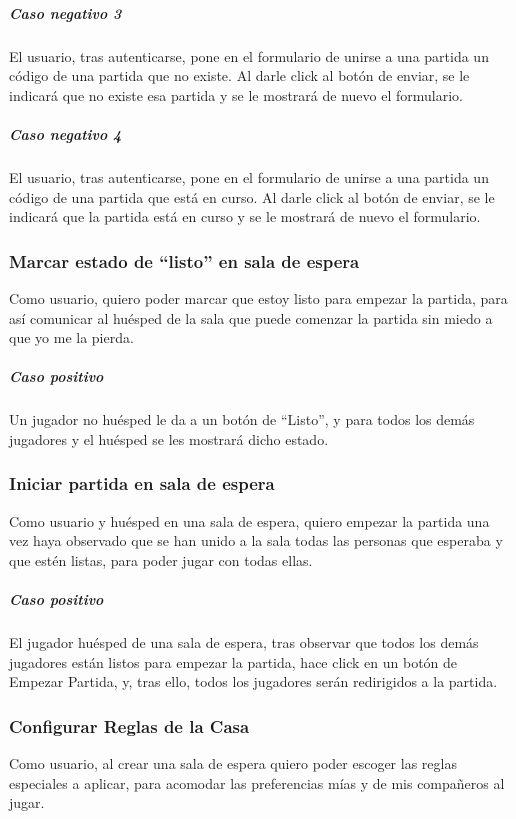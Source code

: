 \subparagraph{Caso negativo 3}
El usuario, tras autenticarse, pone en el formulario de unirse a una partida un código de una partida que no existe. Al darle click al botón de enviar, se le indicará que no existe esa partida y se le mostrará de nuevo el formulario. 

\subparagraph{Caso negativo 4}
El usuario, tras autenticarse, pone en el formulario de unirse a una partida un código de una partida que está en curso. Al darle click al botón de enviar, se le indicará que la partida está en curso y se le mostrará de nuevo el formulario. 

\subsubsection{Marcar estado de “listo” en sala de espera}

Como usuario, quiero poder marcar que estoy listo para empezar la partida, para así comunicar al huésped de la sala que puede comenzar la partida sin miedo a que yo me la pierda. 

\subparagraph{Caso positivo}

Un jugador no huésped le da a un botón de “Listo”, y para todos los demás jugadores y el huésped se les mostrará dicho estado. 

\subsubsection{Iniciar partida en sala de espera}

Como usuario y huésped en una sala de espera, quiero empezar la partida una vez haya observado que se han unido a la sala todas las personas que esperaba y que estén listas, para poder jugar con todas ellas. 

\subparagraph{Caso positivo}

El jugador huésped de una sala de espera, tras observar que todos los demás jugadores están listos para empezar la partida, hace click en un botón de Empezar Partida, y, tras ello, todos los jugadores serán redirigidos a la partida. 

\subsubsection{Configurar Reglas de la Casa}

Como usuario, al crear una sala de espera quiero poder escoger las reglas especiales a aplicar, para acomodar las preferencias mías y de mis compañeros al jugar. 

